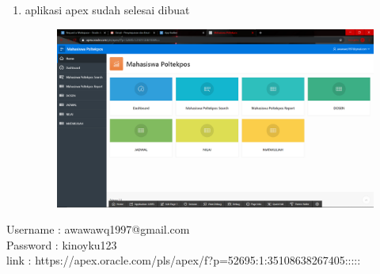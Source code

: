 \begin{enumerate}
\item aplikasi apex sudah selesai dibuat
\begin{figure}[H]
    \centering
    \includegraphics[scale=0.1]{figures/28}
    \caption{}
    \label{Indentasi}
\end{figure}
\end{enumerate}

\par 
Username : awawawq1997@gmail.com \\
Password : kinoyku123 \\
link     : https://apex.oracle.com/pls/apex/f?p=52695:1:35108638267405:::::

